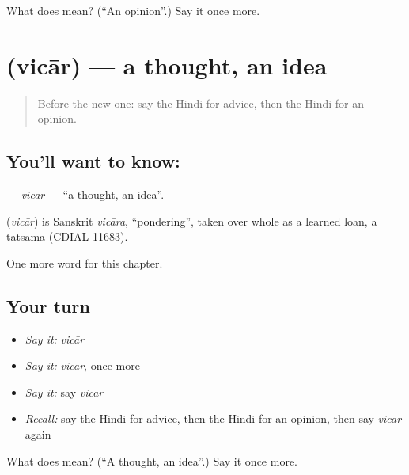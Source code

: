 \begin{tcolorbox}[breakable,colback=teal!4,colframe=teal!35!black,title={Before you move on}]
What does  mean? (\textquotedblleft{}An opinion\textquotedblright{}.) Say it once more.
\end{tcolorbox}
\section[\texorpdfstring{\hi{विचार} (vicār)}{विचार (vicār)}]{ (vicār) — a thought, an idea}

\label{lesson:HI-C206-vicar}



\begin{quote}
Before the new one: say the Hindi for advice, then the Hindi for an opinion.
\end{quote}

\subsection*{You'll want to know: }
\textbf{} — \emph{vicār} — \textquotedblleft{}a thought, an idea\textquotedblright{}.

\begin{cousinweb}
\textbf{} (\emph{vicār}) is Sanskrit \emph{vicāra}, \textquotedblleft{}pondering\textquotedblright{}, taken over whole as a learned loan, a tatsama (CDIAL 11683).
\end{cousinweb}

\begin{grammarlens}[title={What you've built}]
One more word for this chapter.
\end{grammarlens}

\subsection*{Your turn}
\begin{itemize}
\raggedright
  \item \emph{Say it:} \emph{vicār}
  \item \emph{Say it:} \emph{vicār}, once more
  \item \emph{Say it:} say \emph{vicār}
  \item \emph{Recall:} say the Hindi for advice, then the Hindi for an opinion, then say \emph{vicār} again
\end{itemize}

\begin{tcolorbox}[breakable,colback=teal!4,colframe=teal!35!black,title={Before you move on}]
What does  mean? (\textquotedblleft{}A thought, an idea\textquotedblright{}.) Say it once more.
\end{tcolorbox}
